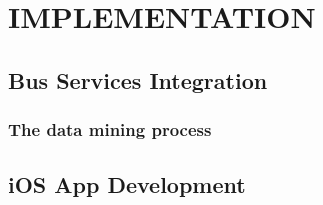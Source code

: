 %
%
\section{IMPLEMENTATION}

\subsection{Bus Services Integration}

\subsubsection{The data mining process}

\subsection{iOS App Development}